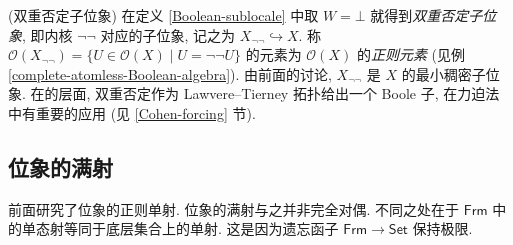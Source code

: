\begin{example}
	[label={double-negation-sublocale}]
	{(双重否定子位象)}
	在定义 \ref{Boolean-sublocale} 中取 $W=\bot$ 就得到\emph{双重否定子位象},
	即内核 $\neg\neg$ 对应的子位象, 记之为 $X_{\neg\neg}\hookrightarrow X$.
	称 $\mathcal O(X_{\neg\neg}) = \{U\in\mathcal O(X)\mid U = \neg\neg U\}$ 的元素为 $\mathcal O(X)$ 的\emph{正则元素} (见例 \ref{complete-atomless-Boolean-algebra}).
	由前面的讨论, $X_{\neg\neg}$ 是 $X$ 的最小稠密子位象.
	在\topos{}的层面, 双重否定作为 Lawvere--Tierney 拓扑给出一个 Boole 子\topos{}, 在力迫法中有重要的应用 (见 \ref{Cohen-forcing} 节).
\end{example}

\subsection{位象的满射}

前面研究了位象的正则单射. 位象的满射与之并非完全对偶. 不同之处在于 $\mathsf {Frm}$ 中的单态射等同于底层集合上的单射. 这是因为遗忘函子 $\mathsf {Frm}\to\mathsf {Set}$ 保持极限.

